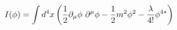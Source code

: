\begin{equation}
\label{ventitre}
 I(\phi)=\int d^4 x \left (  {1 \over 2} 
\partial_{\mu} \phi ~ \partial^{\mu} \phi
 - {1 \over 2} m^2 \phi ^2 -{  \lambda 
\over 4!} \phi ^{4*}\right )
\end{equation}

